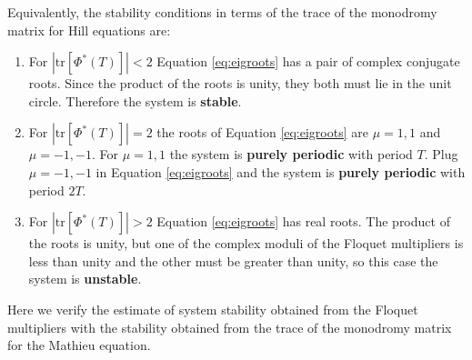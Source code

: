 \documentclass{article}
\begin{document}
Equivalently, the stability conditions in terms of the 
trace of the monodromy matrix for Hill equations are:
\begin{enumerate}[label=(\alph*)]
\item For $|\text{tr}[\Phi^*(T)]|<2$ Equation \ref{eq:eigroots} has a pair of complex conjugate 
roots. Since the product 
of the roots is unity, they both must lie in the unit circle. 
Therefore the system is \textbf{stable}.
\item For $|\text{tr}[\Phi^*(T)]|=2$ the roots of Equation \ref{eq:eigroots} are $\mu=1,1$ and
$\mu=-1,-1$. For $\mu=1,1$ the system is \textbf{purely periodic} 
with period $T$. Plug $\mu=-1,-1$ in Equation \ref{eq:eigroots} and the system is \textbf{purely periodic} 
with period $2T$.
\item For $|\text{tr}[\Phi^*(T)]|>2$ Equation \ref{eq:eigroots} has real roots. The product 
of the roots is unity, but one of the complex moduli of the Floquet multipliers is 
less than unity and the other must be greater
than unity, so this case the system is \textbf{unstable}.
\end{enumerate}
Here we verify the estimate of system stability obtained from the Floquet multipliers 
with the stability obtained from the trace of the monodromy matrix for the Mathieu equation.

% 

\newpage
 
\end{document}
